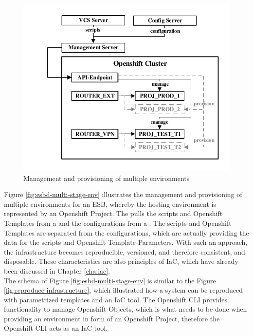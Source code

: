 \begin{figure}[htbp]
	\centering
	\includegraphics[scale=1]{images/esbd-multi-stage-env.pdf}
	\caption{Management and provisioning of multiple environments}
	\label{fig:esbd-multi-stage-env}
\end{figure}

Figure \vref{fig:esbd-multi-stage-env} illustrates the management and provisioning of multiple environments for an ESB, whereby the hosting environment is represented by an Openshift Project. The  pulls the scripts and Openshift Templates from a  and the configurations from a . The scripts and Openshift Templates are separated from the configurations, which are actually providing the data for the scripts and Openshift Template-Parameters. With such an approach, the infrastructure becomes reproducible, versioned, and therefore consistent, and disposable. These characteristics are also principles of IaC, which have already been discussed in Chapter \vref{cha:iac}. \\

The schema of Figure \vref{fig:esbd-multi-stage-env} is similar to the Figure \vref{fig:reproduce-infrastructure}, which illustrated how a system can be reproduced with parametrized templates and an IaC tool. The Openshift CLI provides functionality to manage Openshift Objects, which is what needs to be done when providing an environment in form of an Openshift Project, therefore the Openshift CLI acts as an IaC tool. 



